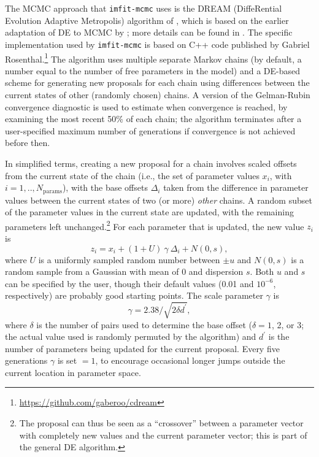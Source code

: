 \documentclass[10pt,a4paper,article]{memoir}
\newcommand{\imfitmcmc}{\texttt{imfit-mcmc}}
\begin{document}
The MCMC approach that \imfitmcmc{} uses is the DREAM (DiffeRential
Evolution Adaptive Metropolis) algorithm of \citet{vrugt09}, which is
based on the earlier adaptation of DE to MCMC by \citet{ter-braak06};
more details can be found in \citet{vrugt16}. The specific
implementation used by \imfitmcmc{} is based on C++ code published by
Gabriel Rosenthal.\footnote{\url{https://github.com/gaberoo/cdream}} The
algorithm uses multiple separate Markov chains (by default, a number
equal to the number of free parameters in the model) and a DE-based
scheme for generating new proposals for each chain using differences
between the current states of other (randomly chosen) chains. A version
of the Gelman-Rubin convergence diagnostic \citep{gelman-rubin} is used
to estimate when convergence is reached, by examining the most recent
50\% of each chain; the algorithm terminates after a user-specified
maximum number of generations if convergence is not achieved before then.

In simplified terms, creating a new proposal for a chain involves scaled
offsets from the current state of the chain (i.e., the set of parameter
values $x_{i}$, with $i = 1, .., N_{\textrm{params}}$), with the base
offsets $\Delta_{i}$ taken from the difference in parameter values
between the current states of two (or more) \textit{other} chains. A
random subset of the parameter values in the current state are updated,
with the remaining parameters left unchanged.\footnote{The proposal can
thus be seen as a ``crossover'' between a parameter vector with
completely new values and the current parameter vector; this is part
of the general DE algorithm.} For each parameter that is updated, the
new value $z_{i}$ is
\begin{equation}
z_{i} = x_{i} + (1 + U) \: \gamma \: \Delta_{i} + N(0,s) ,
\end{equation}
where $U$ is a uniformly sampled random number between $\pm u$ and
$N(0,s)$ is a random sample from a Gaussian with mean of 0 and
dispersion $s$. Both $u$ and $s$ can be specified by the user, though
their default values (0.01 and $10^{-6}$, respectively) are probably
good starting points. The scale parameter $\gamma$ is
\begin{equation}
\gamma = 2.38 / \sqrt{2 \delta d^{\prime}},
\end{equation}
where $\delta$ is the number of pairs used to determine the base offset
($\delta = 1$, 2, or 3; the actual value used is randomly permuted by
the algorithm) and $d^{\prime}$ is the number of parameters being
updated for the current proposal. Every five generations $\gamma$ is set
$= 1$, to encourage occasional longer jumps outside the current location
in parameter space.
\end{document}
